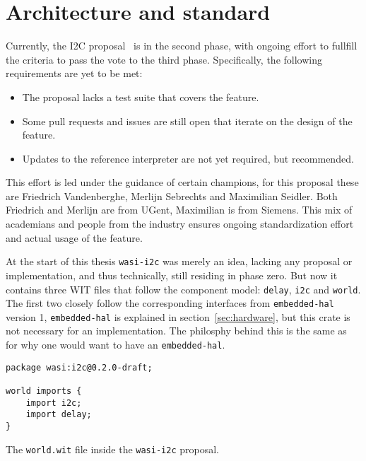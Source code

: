 \chapter{Architecture and standard}
\label{chap:architecture}


Currently, the \gls{I2C} proposal~\cite{gh:i2c} is in the second phase, with ongoing effort to fullfill the criteria to pass the vote to the third phase. Specifically, the following requirements are yet to be met:

\begin{itemize}
    \item The proposal lacks a test suite that covers the feature.
    \item Some pull requests and issues are still open that iterate on the design of the feature.
    \item Updates to the reference interpreter are not yet required, but recommended.
\end{itemize}

This effort is led under the guidance of certain champions, for this proposal these are Friedrich Vandenberghe, Merlijn Sebrechts and Maximilian Seidler. Both Friedrich and Merlijn are from UGent, Maximilian is from Siemens. This mix of academians and people from the industry ensures ongoing standardization effort and actual usage of the feature.

At the start of this thesis \texttt{wasi-i2c} was merely an idea, lacking any proposal or implementation, and thus technically, still residing in phase zero. But now it contains three \gls{WIT} files that follow the component model: \texttt{delay}, \texttt{i2c} and \texttt{world}. The first two closely follow the corresponding interfaces from \texttt{embedded-hal} version 1, \texttt{embedded-hal} is explained in section~\ref{sec:hardware}, but this crate is not necessary for an implementation. The philosphy behind this is the same as for why one would want to have an \texttt{embedded-hal}.

\begin{listing}[h]
\begin{verbatim}
package wasi:i2c@0.2.0-draft;

world imports {
    import i2c;
    import delay;
}
\end{verbatim}
\caption{The \texttt{world.wit} file inside the \texttt{wasi-i2c} proposal.}
\label{code:world}
\end{listing}

